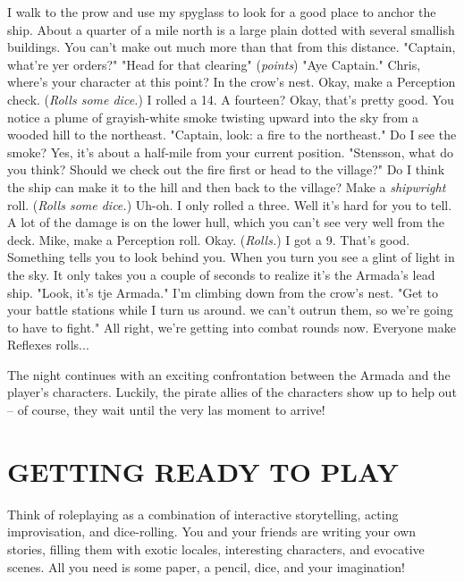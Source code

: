 \documentclass[10pt, a4paper, twoside]{book}
\begin{document}
\begin{multicols}{2}
\begin{dialogue}
			 I walk to the prow and use my spyglass to look for a good place to anchor the ship.
			 About a quarter of a mile north is a large plain dotted with several smallish buildings. You can't make out much more than  that from this distance.
			 "Captain, what're yer orders?"
			 "Head for that clearing" (\textit{points})
			 "Aye Captain."
			 Chris, where's your character at this point?
			 In the crow's nest.
			 Okay, make a Perception check.
			 (\textit{Rolls some dice.}) I rolled a 14.
			 A fourteen? Okay, that's pretty good. You notice a plume of grayish-white smoke twisting upward into the sky from a wooded hill to the northeast.
			 "Captain, look: a fire to the northeast."
			 Do I see the smoke?
			 Yes, it's about a half-mile from your current position.
			 "Stensson, what do you think? Should we check out the fire first or head to the village?"
			 Do I think the ship can make it to the hill and then back to the village?
			 Make a \textit{shipwright} roll.
			 (\textit{Rolls some dice.}) Uh-oh. I only rolled a three.
			 Well it's hard for you to tell. A lot of the damage is on the lower hull, which you can't see very well from the deck. Mike, make a Perception roll.
			 Okay. (\textit{Rolls.}) I got a 9.
			 That's good. Something tells you to look behind you. When you turn you see a glint of light in the sky. It only takes you a couple of seconds to realize it's the Armada's lead ship.
			 "Look, it's tje Armada."
			 I'm climbing down from the crow's nest.
			 "Get to your battle stations while I turn us around. we can't outrun them, so we're going to have to fight."
			 All right, we're getting into combat rounds now. Everyone make Reflexes rolls...
		\end{dialogue}
		The night continues with an exciting confrontation between the Armada and the player's characters. Luckily, the pirate allies of the characters show up to help out -- of course, they wait until the very las moment to arrive!
		\section*{GETTING READY TO PLAY}
		Think of roleplaying as a combination of interactive storytelling, acting improvisation, and dice-rolling. You and your friends are writing your own stories, filling them with exotic locales, interesting characters, and evocative scenes. All you need is some paper, a pencil, dice, and your imagination!
	\end{multicols}
\end{document}
